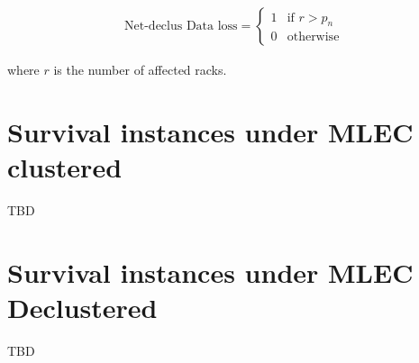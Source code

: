 \documentclass{article}
\begin{document}
\begin{eqnarray}
  \text{Net-declus Data loss} =
    \begin{cases}
      1 & \text{if $r > p_n$}\\
      0 & \text{otherwise}
    \end{cases}       
\label{eq:net_dp:1}
\end{eqnarray}

where $r$ is the number of affected racks.

\section{Survival instances under MLEC clustered}

TBD

\section{Survival instances under MLEC Declustered}

TBD
\end{document}
